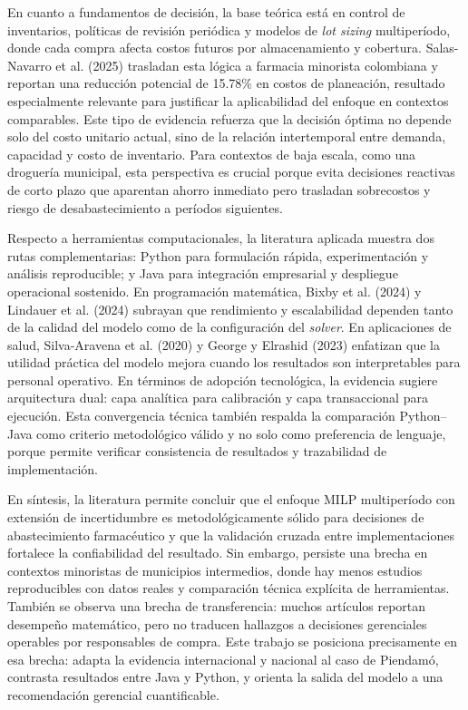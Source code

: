 \documentclass[12pt,letterpaper]{article}
\begin{document}
En cuanto a fundamentos de decisión, la base teórica está en control de inventarios, políticas de revisión periódica y modelos de \textit{lot sizing} multiperíodo, donde cada compra afecta costos futuros por almacenamiento y cobertura. Salas-Navarro et al. (2025) trasladan esta lógica a farmacia minorista colombiana y reportan una reducción potencial de 15.78\% en costos de planeación, resultado especialmente relevante para justificar la aplicabilidad del enfoque en contextos comparables. Este tipo de evidencia refuerza que la decisión óptima no depende solo del costo unitario actual, sino de la relación intertemporal entre demanda, capacidad y costo de inventario. Para contextos de baja escala, como una droguería municipal, esta perspectiva es crucial porque evita decisiones reactivas de corto plazo que aparentan ahorro inmediato pero trasladan sobrecostos y riesgo de desabastecimiento a períodos siguientes.

Respecto a herramientas computacionales, la literatura aplicada muestra dos rutas complementarias: Python para formulación rápida, experimentación y análisis reproducible; y Java para integración empresarial y despliegue operacional sostenido. En programación matemática, Bixby et al. (2024) y Lindauer et al. (2024) subrayan que rendimiento y escalabilidad dependen tanto de la calidad del modelo como de la configuración del \textit{solver}. En aplicaciones de salud, Silva-Aravena et al. (2020) y George y Elrashid (2023) enfatizan que la utilidad práctica del modelo mejora cuando los resultados son interpretables para personal operativo. En términos de adopción tecnológica, la evidencia sugiere arquitectura dual: capa analítica para calibración y capa transaccional para ejecución. Esta convergencia técnica también respalda la comparación Python--Java como criterio metodológico válido y no solo como preferencia de lenguaje, porque permite verificar consistencia de resultados y trazabilidad de implementación.

En síntesis, la literatura permite concluir que el enfoque MILP multiperíodo con extensión de incertidumbre es metodológicamente sólido para decisiones de abastecimiento farmacéutico y que la validación cruzada entre implementaciones fortalece la confiabilidad del resultado. Sin embargo, persiste una brecha en contextos minoristas de municipios intermedios, donde hay menos estudios reproducibles con datos reales y comparación técnica explícita de herramientas. También se observa una brecha de transferencia: muchos artículos reportan desempeño matemático, pero no traducen hallazgos a decisiones gerenciales operables por responsables de compra. Este trabajo se posiciona precisamente en esa brecha: adapta la evidencia internacional y nacional al caso de Piendamó, contrasta resultados entre Java y Python, y orienta la salida del modelo a una recomendación gerencial cuantificable.
\end{document}
